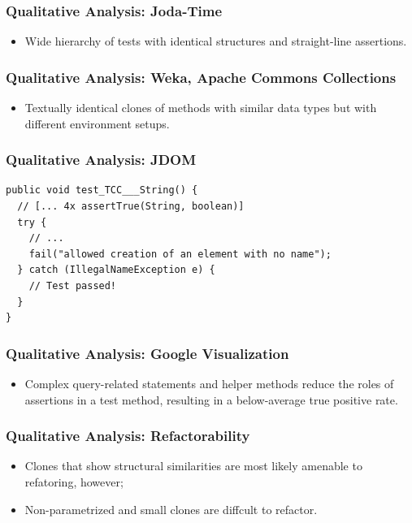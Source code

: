 \documentclass{beamer}
\begin{document}
\begin{frame}
\frametitle{Qualitative Analysis: Joda-Time} {
   \Large
     \begin{itemize}
        \item Wide hierarchy of tests with identical structures and straight-line assertions.
     \end{itemize}
}
\end{frame}

\begin{frame}
\frametitle{Qualitative Analysis: Weka, Apache Commons Collections} {
   \Large
   \begin{itemize}
      \item Textually identical clones of methods with similar data types
         but with different environment setups.
   \end{itemize}    
}
\end{frame}

\begin{frame}[fragile]
\frametitle{Qualitative Analysis: JDOM} {
\begin{lstlisting}
public void test_TCC___String() {
  // [... 4x assertTrue(String, boolean)]
  try {
    // ...
    fail("allowed creation of an element with no name");
  } catch (IllegalNameException e) { 
    // Test passed!
  }
}
\end{lstlisting}
}
\end{frame}

\begin{frame}
\frametitle{Qualitative Analysis: Google Visualization} {
   \Large
   \begin{itemize}
      \item Complex query-related statements and helper methods reduce
         the roles of assertions in a test method, 
         resulting in a below-average true positive rate.
   \end{itemize}    
}
\end{frame}

\begin{frame}
\frametitle{Qualitative Analysis: Refactorability} {
   \Large
   \begin{itemize}
      \item Clones that show structural similarities are most likely amenable to
         refatoring, however;
         \vspace{0.5cm}
      \item Non-parametrized and small clones are diffcult to refactor.
   \end{itemize}    
}
\end{frame}
\end{document}
